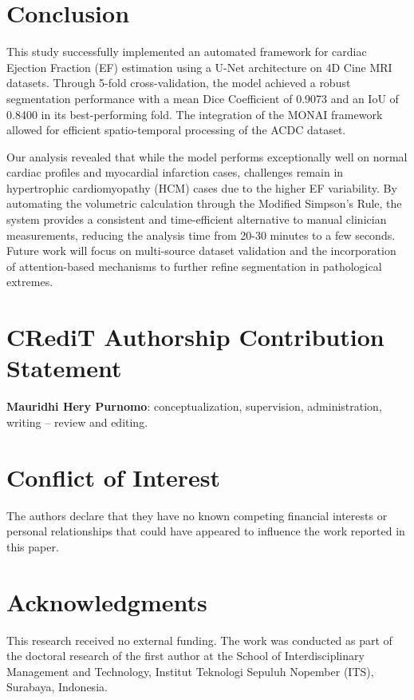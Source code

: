\documentclass[final,3p,times,twocolumn]{elsarticle}
\begin{document}
\section{Conclusion}
\label{sec:conclusion}
This study successfully implemented an automated framework for cardiac Ejection Fraction (EF) estimation using a U-Net architecture on 4D Cine MRI datasets. Through 5-fold cross-validation, the model achieved a robust segmentation performance with a mean Dice Coefficient of 0.9073 and an IoU of 0.8400 in its best-performing fold. The integration of the MONAI framework allowed for efficient spatio-temporal processing of the ACDC dataset.

Our analysis revealed that while the model performs exceptionally well on normal cardiac profiles and myocardial infarction cases, challenges remain in hypertrophic cardiomyopathy (HCM) cases due to the higher EF variability. By automating the volumetric calculation through the Modified Simpson's Rule, the system provides a consistent and time-efficient alternative to manual clinician measurements, reducing the analysis time from 20-30 minutes to a few seconds. Future work will focus on multi-source dataset validation and the incorporation of attention-based mechanisms to further refine segmentation in pathological extremes.


\section*{CRediT Authorship Contribution Statement}
\textbf{Mauridhi Hery Purnomo}: conceptualization, supervision, administration, writing – review and editing.

\section*{Conflict of Interest}
The authors declare that they have no known competing financial interests or personal relationships that could have appeared to influence the work reported in this paper.

\section*{Acknowledgments}
This research received no external funding. The work was conducted as part of the doctoral research of the first author at the School of Interdisciplinary Management and Technology, Institut Teknologi Sepuluh Nopember (ITS), Surabaya, Indonesia.
\end{document}
